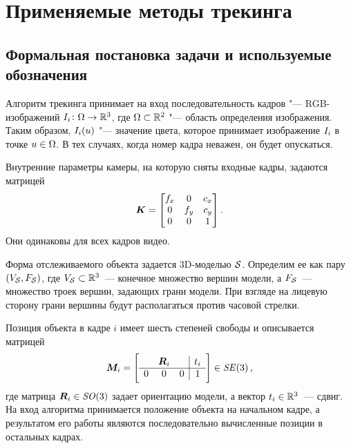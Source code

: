 \section{Применяемые методы трекинга}

\subsection{Формальная постановка задачи и используемые обозначения}

Алгоритм трекинга принимает на вход последовательность кадров "---
RGB-изображений
$
    I_i \colon \Omega \to \mathbb{R}^3
$,
где $\Omega \subset \mathbb{R}^2$ "--- область определения изображения.
Таким образом, $I_i(\mathnormal{u})$ "--- значение цвета, которое принимает
изображение $I_i$ в точке $\mathnormal{u} \in \Omega$.
В тех случаях, когда номер кадра неважен, он будет опускаться.

Внутренние параметры камеры, на которую сняты входные кадры, задаются матрицей
\begin{equation}\label{eqn:camintr}
    \bm{K} = \begin{bmatrix}
        f_x & 0   & c_x \\
        0   & f_y & c_y \\
        0   & 0   & 1
    \end{bmatrix}
    \text{.}
\end{equation}
Они одинаковы для всех кадров видео.

Форма отслеживаемого объекта задается 3D-моделью $\mathcal{S}$.
Определим ее как пару $(V_{\mathcal{S}}, F_{\mathcal{S}})$, где
$V_{\mathcal{S}} \subset \mathbb{R}^3$~--- конечное множество вершин модели, а
$F_{\mathcal{S}}$~--- множество троек вершин, задающих грани модели.
При взгляде на лицевую сторону грани вершины будут располагаться против часовой
стрелки.

Позиция объекта в кадре $i$ имеет шесть степеней свободы и описывается матрицей
\begin{equation}\label{eqn:modelpose}
    \bm{M}_i = \left[ \begin{array}{ccc|c}
          & \bm{R}_i &   & \mathnormal{t}_i \\
        \hline
        0 & 0         & 0 & 1
    \end{array} \right] \in \mathit{SE}(3)
    \,\text{,}
\end{equation}
где матрица $\bm{R}_i \in \mathit{SO}(3)$ задает ориентацию модели, а вектор
$\mathnormal{t}_i \in \mathbb{R}^3$~--- сдвиг.
На вход алгоритма принимается положение объекта на начальном кадре,
а результатом его работы являются последовательно вычисленные позиции
в остальных кадрах.


